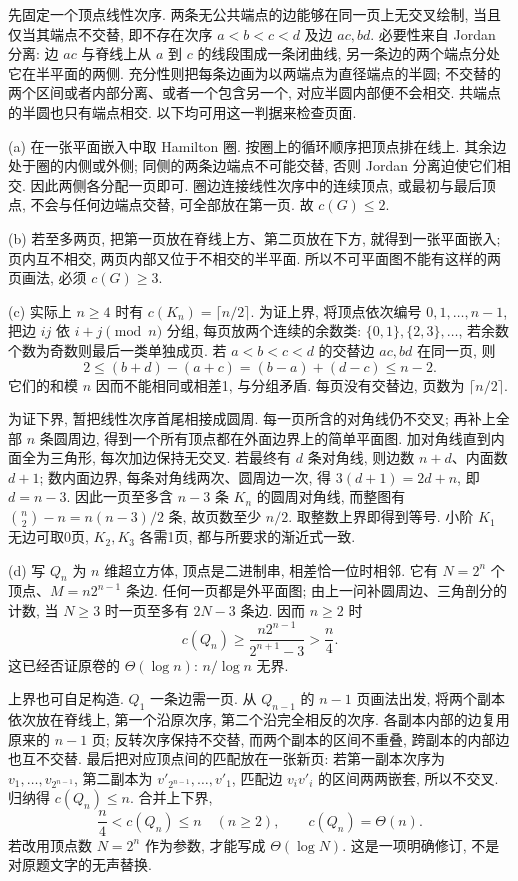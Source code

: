 \begin{solution}
先固定一个顶点线性次序. 两条无公共端点的边能够在同一页上无交叉绘制,
当且仅当其端点不交替, 即不存在次序 $a<b<c<d$ 及边 $ac,bd$.
必要性来自 Jordan 分离: 边 $ac$ 与脊线上从 $a$ 到 $c$ 的线段围成一条闭曲线,
另一条边的两个端点分处它在半平面的两侧.
充分性则把每条边画为以两端点为直径端点的半圆;
不交替的两个区间或者内部分离、或者一个包含另一个,
对应半圆内部便不会相交. 共端点的半圆也只有端点相交.
以下均可用这一判据来检查页面.

(a) 在一张平面嵌入中取 Hamilton 圈. 按圈上的循环顺序把顶点排在线上.
其余边处于圈的内侧或外侧; 同侧的两条边端点不可能交替,
否则 Jordan 分离迫使它们相交. 因此两侧各分配一页即可.
圈边连接线性次序中的连续顶点, 或最初与最后顶点,
不会与任何边端点交替, 可全部放在第一页. 故 $c(G)\le2$.

(b) 若至多两页, 把第一页放在脊线上方、第二页放在下方,
就得到一张平面嵌入; 页内互不相交, 两页内部又位于不相交的半平面.
所以不可平面图不能有这样的两页画法, 必须 $c(G)\ge3$.

(c) 实际上 $n\ge4$ 时有 $c(K_n)=\lceil n/2\rceil$.
为证上界, 将顶点依次编号 $0,1,\ldots,n-1$,
把边 $ij$ 依 $i+j\pmod n$ 分组, 每页放两个连续的余数类:
$\{0,1\},\{2,3\},\ldots$, 若余数个数为奇数则最后一类单独成页.
若 $a<b<c<d$ 的交替边 $ac,bd$ 在同一页, 则
\[
2\le(b+d)-(a+c)=(b-a)+(d-c)\le n-2.
\]
它们的和模 $n$ 因而不能相同或相差1, 与分组矛盾.
每页没有交替边, 页数为 $\lceil n/2\rceil$.

为证下界, 暂把线性次序首尾相接成圆周.
每一页所含的对角线仍不交叉; 再补上全部 $n$ 条圆周边,
得到一个所有顶点都在外面边界上的简单平面图.
加对角线直到内面全为三角形, 每次加边保持无交叉.
若最终有 $d$ 条对角线, 则边数 $n+d$、内面数 $d+1$;
数内面边界, 每条对角线两次、圆周边一次, 得
$3(d+1)=2d+n$, 即 $d=n-3$.
因此一页至多含 $n-3$ 条 $K_n$ 的圆周对角线,
而整图有 $\binom n2-n=n(n-3)/2$ 条, 故页数至少 $n/2$.
取整数上界即得到等号. 小阶 $K_1$ 无边可取0页,
$K_2,K_3$ 各需1页, 都与所要求的渐近式一致.

(d) 写 $Q_n$ 为 $n$ 维超立方体, 顶点是二进制串, 相差恰一位时相邻.
它有 $N=2^n$ 个顶点、$M=n2^{n-1}$ 条边.
任何一页都是外平面图; 由上一问补圆周边、三角剖分的计数,
当 $N\ge3$ 时一页至多有 $2N-3$ 条边. 因而 $n\ge2$ 时
\[
c(Q_n)\ge\frac{n2^{n-1}}{2^{n+1}-3}>\frac n4.
\]
这已经否证原卷的 $\Theta(\log n)$: $n/\log n$ 无界.

上界也可自足构造. $Q_1$ 一条边需一页.
从 $Q_{n-1}$ 的 $n-1$ 页画法出发, 将两个副本依次放在脊线上,
第一个沿原次序, 第二个沿完全相反的次序.
各副本内部的边复用原来的 $n-1$ 页; 反转次序保持不交替,
而两个副本的区间不重叠, 跨副本的内部边也互不交替.
最后把对应顶点间的匹配放在一张新页: 若第一副本次序为
$v_1,\ldots,v_{2^{n-1}}$, 第二副本为
$v'_{2^{n-1}},\ldots,v'_1$,
匹配边 $v_iv'_i$ 的区间两两嵌套, 所以不交叉.
归纳得 $c(Q_n)\le n$. 合并上下界,
\[
\frac n4<c(Q_n)\le n\quad(n\ge2),\qquad c(Q_n)=\Theta(n).
\]
若改用顶点数 $N=2^n$ 作为参数, 才能写成 $\Theta(\log N)$.
这是一项明确修订, 不是对原题文字的无声替换.


\end{solution}
